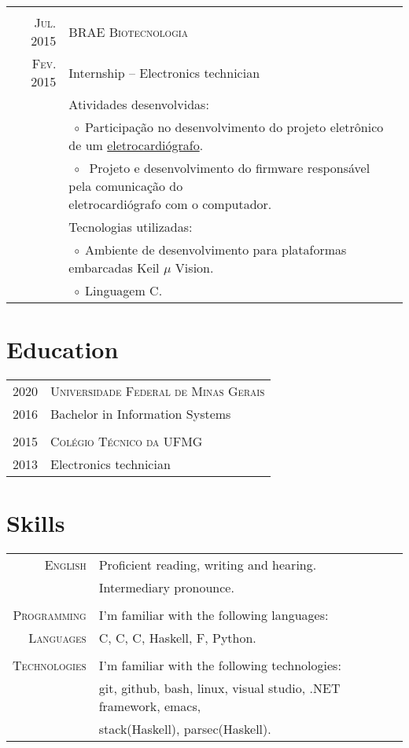 \documentclass[a4paper,10pt]{article}
\newcommand{\tabitem}{$\;\circ\;$}
\newcommand{\cpp}{C\protect\scalebox{0.8}{\protect\raisebox{0.4ex}{++}}}
\renewcommand\#{\protect\scalebox{0.8}{\protect\raisebox{0.4ex}{\char"0023}}}
\begin{document}
\begin{tabular}{r|p{12.3cm}}
  \multicolumn{2}{c}{} \\
  \textsc{Jul. 2015} & \textsc{BRAE Biotecnologia} \\
  \textsc{Fev. 2015} & Internship -- Electronics technician \\[5pt]
  & Atividades desenvolvidas: \\
  & \tabitem Participação no desenvolvimento do projeto eletrônico de um \href{http://www.ferox.vet.br/pt-br/produtos/ecg-veterinario.aspx}{eletrocardiógrafo}. \\
  & \tabitem \makecell[lt]{
              Projeto e desenvolvimento do firmware responsável pela comunicação do \\
              eletrocardiógrafo com o computador.
             } \\
  & Tecnologias utilizadas: \\
  & \tabitem Ambiente de desenvolvimento para plataformas embarcadas Keil $\mu$ \kern-5pt Vision. \\
  & \tabitem Linguagem C.
\end{tabular}


\section{Education}
\begin{tabular}{r|l}
  \textsc{2020} & \textsc{Universidade Federal de Minas Gerais} \\
  \textsc{2016} & Bachelor in Information Systems \\
  
  \multicolumn{2}{c}{} \\
  \textsc{2015} & \textsc{Colégio Técnico da UFMG} \\
  \textsc{2013} & Electronics technician \\
\end{tabular}


\section{Skills}
\begin{tabular}{r|l}
  \textsc{English} & Proficient reading, writing and hearing. \\
  & Intermediary pronounce. \\
  
  \multicolumn{2}{c}{} \\
  \textsc{Programming} & I'm familiar with the following languages: \\
  \textsc{Languages} & C, \cpp, C\#, Haskell, F\#, Python. \\
  
  \multicolumn{2}{c}{} \\
  \textsc{Technologies} & I'm familiar with the following technologies: \\
  & git, github, bash, linux, visual studio, .NET framework, emacs, \\
  & stack(Haskell), parsec(Haskell).
\end{tabular}
\end{document}
